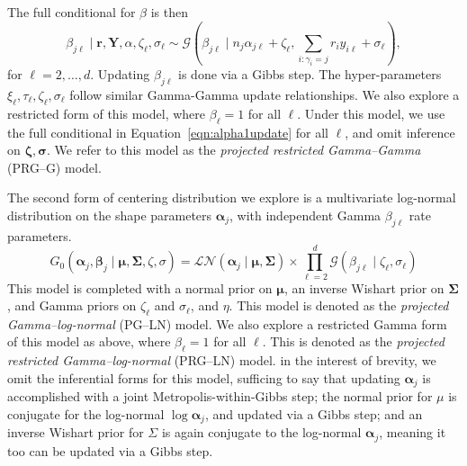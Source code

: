 \documentclass[12pt]{article}
\begin{document}
The full conditional for $\beta$ is then
\begin{equation}
    \beta_{j\ell}\mid\bm{r},\bm{Y},\alpha,\zeta_{\ell},\sigma_{\ell} \sim \mathcal{G}\left(\beta_{j\ell}\mid n_j\alpha_{j\ell} + \zeta_\ell, \sum_{i:\gamma_i = j}r_iy_{i\ell} + \sigma_{\ell}\right),
\end{equation}
for $\ell = 2,\ldots, d$.  Updating $\beta_{j\ell}$ is done via a Gibbs step.  The hyper-parameters $\xi_{\ell},\tau_{\ell},\zeta_{\ell},\sigma_{\ell}$ follow similar Gamma-Gamma update relationships.  We also explore a restricted form of this model, where $\beta_{\ell} = 1$ for all $\ell$.  Under this model, we use the full conditional in Equation~\ref{eqn:alpha1update} for all $\ell$, and omit inference on $\bm{\zeta},\bm{\sigma}$.  We refer to this model as the \emph{projected restricted Gamma--Gamma} (PRG--G) model.

The second form of centering distribution we explore is a multivariate log-normal distribution on the shape parameters $\bm{\alpha}_j$, with independent Gamma $\beta_{j\ell}$ rate parameters.  
\begin{equation}
    G_0\left(\bm{\alpha}_j,\bm{\beta}_j\mid\bm{\mu},\bm{\Sigma},\zeta,\sigma\right) = \mathcal{LN}\left(\bm{\alpha}_j\mid\bm{\mu},\bm{\Sigma}\right)\times\prod_{\ell = 2}^d\mathcal{G}\left(\beta_{j\ell}\mid\zeta_{\ell},\sigma_{\ell}\right)
\end{equation}
This model is completed with a normal prior on $\bm{\mu}$, an inverse Wishart prior on $\bm{\Sigma}$, and Gamma priors on $\zeta_{\ell}$ and $\sigma_{\ell}$, and $\eta$.  This model is denoted as the \emph{projected Gamma--log-normal} (PG--LN) model.  We also explore a restricted Gamma form of this model as above, where $\beta_{\ell} = 1$ for all $\ell$.  This is denoted as the \emph{projected restricted Gamma--log-normal} (PRG--LN) model.  in the interest of brevity, we omit the inferential forms for this model, sufficing to say that updating $\bm{\alpha}_j$ is accomplished with a joint Metropolis-within-Gibbs step; the normal prior for $\mu$ is conjugate for the log-normal $\log\bm{\alpha}_j$, and updated via a Gibbs step; and an inverse Wishart prior for $\Sigma$ is again conjugate to the log-normal $\bm{\alpha}_j$, meaning it too can be updated via a Gibbs step.
\end{document}
